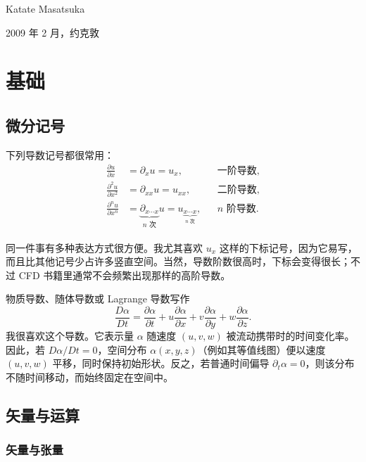 \documentclass[11pt,a4paper,openany,fontset=none]{ctexbook}
\begin{document}
\begin{flushright}
Katate Masatsuka\par
2009 年 2 月，约克敦
\end{flushright}

\mainmatter
\chapter{基础}

\section{微分记号}

下列导数记号都很常用：
\begin{align}
  \frac{\partial u}{\partial x}&=\partial_xu=u_x, &&\text{一阶导数}, \tag{1.1.1}\\
  \frac{\partial^2u}{\partial x^2}&=\partial_{xx}u=u_{xx}, &&\text{二阶导数}, \tag{1.1.2}\\
  \frac{\partial^nu}{\partial x^n}&=\underbrace{\partial_{x\cdots x}}_{n\text{ 次}}u
  =u_{\underbrace{x\cdots x}_{n\text{ 次}}}, &&n\text{ 阶导数}. \tag{1.1.3}
\end{align}

同一件事有多种表达方式很方便。我尤其喜欢 $u_x$ 这样的下标记号，因为它易写，而且比其他记号少占许多竖直空间。当然，导数阶数很高时，下标会变得很长；不过 CFD 书籍里通常不会频繁出现那样的高阶导数。

物质导数、随体导数或 Lagrange 导数写作
\begin{equation}
  \frac{D\alpha}{Dt}=\frac{\partial\alpha}{\partial t}
  +u\frac{\partial\alpha}{\partial x}
  +v\frac{\partial\alpha}{\partial y}
  +w\frac{\partial\alpha}{\partial z}. \tag{1.1.4}
\end{equation}
我很喜欢这个导数。它表示量 $\alpha$ 随速度 $(u,v,w)$ 被流动携带时的时间变化率。因此，若 $D\alpha/Dt=0$，空间分布 $\alpha(x,y,z)$（例如其等值线图）便以速度 $(u,v,w)$ 平移，同时保持初始形状。反之，若普通时间偏导 $\partial_t\alpha=0$，则该分布不随时间移动，而始终固定在空间中。

\section{矢量与运算}

\subsection{矢量与张量}
\end{document}
